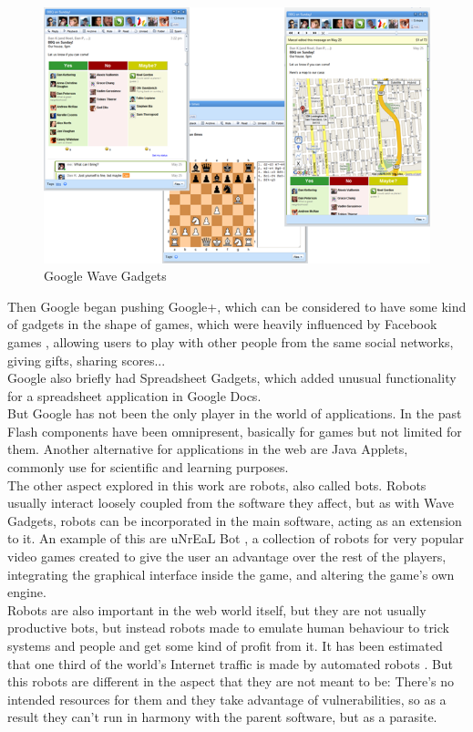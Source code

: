 \begin{figure}[h]
  \center
    \includegraphics[keepaspectratio, scale=0.5]{Media/Captures/Soa/WaveGadgets.png}
  \caption{Google Wave Gadgets}
  \label{fig:wave_gadgets}
\end{figure}
Then Google began pushing Google+, which can be considered to have some kind of gadgets in the shape of games, which were heavily influenced by Facebook games \cite{ref:facebook_games}, allowing users to play with other people from the same social networks, giving gifts, sharing scores...\\[.2cm]
Google also briefly had Spreadsheet Gadgets, which added unusual functionality for a spreadsheet application in Google Docs.\\[.2cm]
But Google has not been the only player in the world of applications. In the past Flash components have been omnipresent, basically for games but not limited for them. Another alternative for applications in the web are Java Applets, commonly use for scientific and learning purposes.\\[.2cm]
The other aspect explored in this work are robots, also called bots. Robots usually interact loosely coupled from the software they affect, but as with Wave Gadgets, robots can be incorporated in the main software, acting as an extension to it. An example of this are uNrEaL Bot \cite{ref:unreal_bot}, a collection of robots for very popular video games created to give the user an advantage over the rest of the players, integrating the graphical interface inside the game, and altering the game's own engine.\\[.2cm]
Robots are also important in the web world itself, but they are not usually productive bots, but instead robots made to emulate human behaviour to trick systems and people and get some kind of profit from it. It has been estimated that one third of the world's Internet traffic is made by automated robots \cite{ref:robots_in_the_web}. But this robots are different in the aspect that they are not meant to be: There's no intended resources for them and they take advantage of vulnerabilities, so as a result they can't run in harmony with the parent software, but as a parasite.
